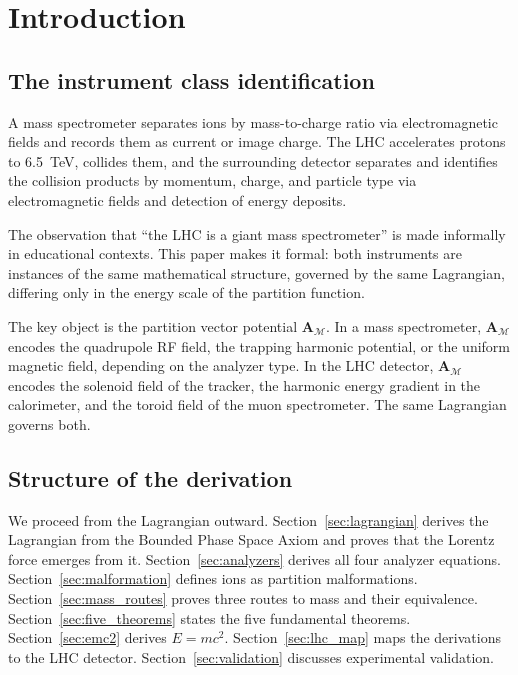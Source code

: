 \documentclass[twocolumn,10pt,a4paper]{article}
\theoremstyle{thmstyle}
\theoremstyle{definition}
\theoremstyle{remark}
\newcommand{\AM}{\mathbf{A}_{\mathcal{M}}}
\begin{document}
\tableofcontents

\section{Introduction}
\label{sec:intro}

\subsection{The instrument class identification}

A mass spectrometer separates ions by mass-to-charge ratio via
electromagnetic fields and records them as current or image charge.
The LHC accelerates protons to 6.5~TeV, collides them, and the
surrounding detector separates and identifies the collision products
by momentum, charge, and particle type via electromagnetic fields and
detection of energy deposits.

The observation that ``the LHC is a giant mass spectrometer'' is made
informally in educational contexts. This paper makes it formal: both
instruments are instances of the same mathematical structure, governed
by the same Lagrangian, differing only in the energy scale of the
partition function.

The key object is the partition vector potential $\AM$. In a mass
spectrometer, $\AM$ encodes the quadrupole RF field, the trapping harmonic
potential, or the uniform magnetic field, depending on the analyzer type.
In the LHC detector, $\AM$ encodes the solenoid field of the tracker,
the harmonic energy gradient in the calorimeter, and the toroid field
of the muon spectrometer. The same Lagrangian governs both.

\subsection{Structure of the derivation}

We proceed from the Lagrangian outward.
Section~\ref{sec:lagrangian} derives the Lagrangian from the Bounded Phase
Space Axiom and proves that the Lorentz force emerges from it.
Section~\ref{sec:analyzers} derives all four analyzer equations.
Section~\ref{sec:malformation} defines ions as partition malformations.
Section~\ref{sec:mass_routes} proves three routes to mass and their equivalence.
Section~\ref{sec:five_theorems} states the five fundamental theorems.
Section~\ref{sec:emc2} derives $E = mc^2$.
Section~\ref{sec:lhc_map} maps the derivations to the LHC detector.
Section~\ref{sec:validation} discusses experimental validation.
\end{document}
